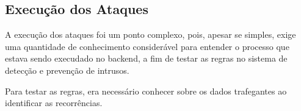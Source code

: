 		\subsection{Execução dos Ataques}
			A execução dos ataques foi um ponto complexo, pois, apesar se simples, exige
			uma quantidade de conhecimento considerável para entender o processo que
			estava sendo execudado no backend, a fim de testar as regras no sistema
			de detecção e prevenção de intrusos.

			Para testar as regras, era necessário conhecer sobre os dados trafegantes
			ao identificar as recorrências.

